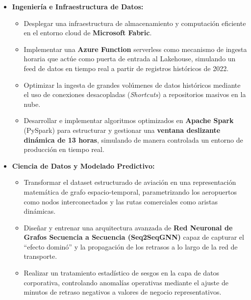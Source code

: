 \documentclass[12pt,oneside,a4paper]{report}
\renewcommand{\_}{\textunderscore\allowbreak}
\begin{document}
\begin{itemize}
    \item \textbf{Ingeniería e Infraestructura de Datos:}
    \begin{itemize}
        \item Desplegar una infraestructura de almacenamiento y computación eficiente en el entorno cloud de \textbf{Microsoft Fabric}.
        \item Implementar una \textbf{Azure Function} serverless como mecanismo de ingesta horaria que actúe como puerta de entrada al Lakehouse, simulando un feed de datos en tiempo real a partir de registros históricos de 2022.
        \item Optimizar la ingesta de grandes volúmenes de datos históricos mediante el uso de conexiones desacopladas (\textit{Shortcuts}) a repositorios masivos en la nube.
        \item Desarrollar e implementar algoritmos optimizados en \textbf{Apache Spark} (PySpark) para estructurar y gestionar una \textbf{ventana deslizante dinámica de 13 horas}, simulando de manera controlada un entorno de producción en tiempo real.
    \end{itemize}

    \item \textbf{Ciencia de Datos y Modelado Predictivo:}
    \begin{itemize}
        \item Transformar el dataset estructurado de aviación en una representación matemática de grafo espacio-temporal, parametrizando los aeropuertos como nodos interconectados y las rutas comerciales como aristas dinámicas.
        \item Diseñar y entrenar una arquitectura avanzada de \textbf{Red Neuronal de Grafos Secuencia a Secuencia (Seq2SeqGNN)} capaz de capturar el ``efecto dominó'' y la propagación de los retrasos a lo largo de la red de transporte.
        \item Realizar un tratamiento estadístico de sesgos en la capa de datos corporativa, controlando anomalías operativas mediante el ajuste de minutos de retraso negativos a valores de negocio representativos.
    \end{itemize}


\end{itemize}
\end{document}
